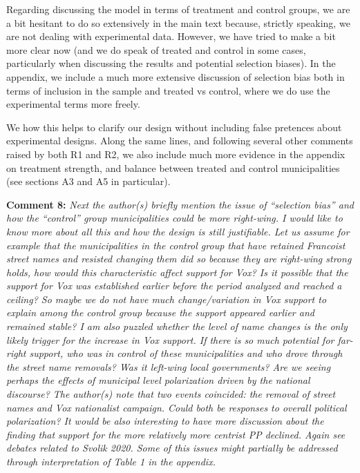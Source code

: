 \documentclass[12pt, a4paper, notitlepage]{article}
\begin{document}
Regarding discussing the model in terms of treatment and control groups, we are a bit hesitant to do so extensively in the main text because, strictly speaking, we are not dealing with experimental data. However, we have tried to make a bit more clear now (and we do speak of treated and control in some cases, particularly when discussing the results and potential selection biases). In the appendix, we include a much more extensive discussion of selection bias both in terms of inclusion in the sample and treated vs control, where we do use the experimental terms more freely.

We how this helps to clarify our design without including false pretences about experimental designs. Along the same lines, and following several other comments raised by both R1 and R2, we also include much more evidence in the appendix on treatment strength, and balance between treated and control municipalities (see sections A3 and A5 in particular).

\textbf{Comment 8:} \textit{Next the author(s) briefly mention the issue of “selection bias” and how the “control” group municipalities could be more right-wing. I would like to know more about all this and how the design is still justifiable.
Let us assume for example that the municipalities in the control group that have retained Francoist street names and resisted changing them did so because they are right-wing strong holds, how would this characteristic affect support for Vox? Is it possible that the support for Vox was established earlier before the period analyzed and reached a ceiling? So maybe we do not have much change/variation in Vox support to explain among the control group because the support appeared earlier and remained stable?
I am also puzzled whether the level of name changes is the only likely trigger for the increase in Vox support. If there is so much potential for far-right support, who was in control of these municipalities and who drove through the street name removals? Was it left-wing local governments? Are we seeing perhaps the effects of municipal level polarization driven by the national discourse?
The author(s) note that two events coincided: the removal of street names and Vox nationalist campaign.  Could both be responses to overall political polarization? It would be also interesting to have more discussion about the finding that support for the more relatively more centrist PP declined. Again see debates related to Svolik 2020. Some of this issues might partially be addressed through interpretation of Table 1 in the appendix.}
\end{document}
